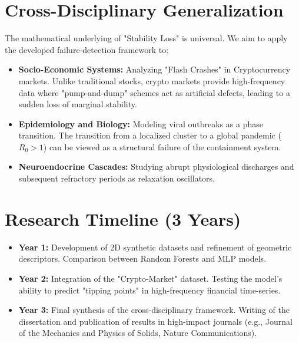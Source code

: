 \documentclass[12pt]{article}
\begin{document}

\section{Cross-Disciplinary Generalization}
The mathematical underlying of "Stability Loss" is universal. We aim to apply the developed failure-detection framework to:

\begin{itemize}
    \item \textbf{Socio-Economic Systems:} Analyzing "Flash Crashes" in Cryptocurrency markets. Unlike traditional stocks, crypto markets provide high-frequency data where "pump-and-dump" schemes act as artificial defects, leading to a sudden loss of marginal stability.
    \item \textbf{Epidemiology and Biology:} Modeling viral outbreaks as a phase transition. The transition from a localized cluster to a global pandemic ($R_0 > 1$) can be viewed as a structural failure of the containment system.
    \item \textbf{Neuroendocrine Cascades:} Studying abrupt physiological discharges and subsequent refractory periods as relaxation oscillators.
\end{itemize}





\section{Research Timeline (3 Years)}
\begin{itemize}
    \item \textbf{Year 1:} Development of 2D synthetic datasets and refinement of geometric descriptors. Comparison between Random Forests and MLP models.
    \item \textbf{Year 2:} Integration of the "Crypto-Market" dataset. Testing the model's ability to predict "tipping points" in high-frequency financial time-series.
    \item \textbf{Year 3:} Final synthesis of the cross-disciplinary framework. Writing of the dissertation and publication of results in high-impact journals (e.g., Journal of the Mechanics and Physics of Solids, Nature Communications).
\end{itemize}
\end{document}
